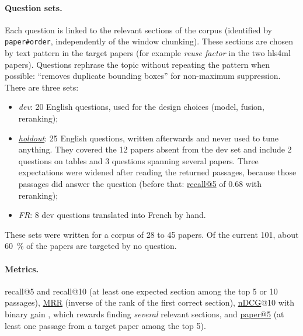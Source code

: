 \documentclass[11pt,a4paper]{article}
\newcommand{\cmd}[1]{\texttt{#1}}
\newcommand{\gl}[2]{\hyperlink{gl:#1}{\textcolor{glcolor}{#2}}}
\begin{document}
\paragraph{Question sets.} Each question is linked to the relevant sections of the corpus
(identified by \cmd{paper\#order}, independently of the window chunking). These sections are
chosen by text pattern in the target papers (for example \emph{reuse factor} in the two
hls4ml papers). Questions rephrase the topic without repeating the pattern when possible:
``removes duplicate bounding boxes'' for non-maximum suppression. There are three sets:
\begin{itemize}
  \item \emph{dev}: 20 English questions, used for the design choices (model, fusion,
    reranking);
  \item \emph{\gl{holdout}{holdout}}: 25 English questions, written afterwards and never used to tune
    anything. They covered the 12 papers absent from the dev set and include 2 questions on
    tables and 3 questions spanning several papers. Three expectations were widened after
    reading the returned passages, because those passages did answer the question (before
    that: \gl{recall}{recall@5} of 0.68 with reranking);
  \item \emph{FR}: 8 dev questions translated into French by hand.
\end{itemize}
These sets were written for a corpus of 28 to 45 papers. Of the current 101, about 60~\% of
the papers are targeted by no question.

\paragraph{Metrics.} recall@5 and recall@10 (at least one expected section among the top 5
or 10 passages), \gl{MRR}{MRR} (inverse of the rank of the first correct section), \gl{nDCG}{nDCG}@10 with binary
gain \citep{jarvelin2002ndcg}, which rewards finding \emph{several} relevant sections, and
\gl{paperk}{paper@5} (at least one passage from a target paper among the top 5).
\end{document}
